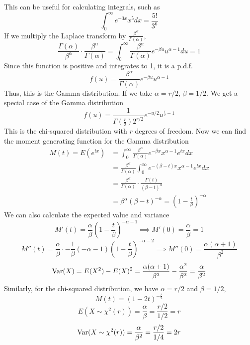 \documentclass[openany]{report}
\begin{document}
This can be useful for calculating integrals, such as 
\[\int_0^\infty e^{-3x}x^5dx = \frac{5!}{3^6}\]
If we multiply the Laplace transform by $\frac{\beta^\alpha}{\Gamma(\alpha)}$, 
\[\frac{\Gamma(\alpha)}{\beta^\alpha} \cdot \frac{\beta^\alpha}{\Gamma(\alpha)} = \int_0^\infty \frac{\beta^{\alpha}}{\Gamma(\alpha)}e^{-\beta u}u^{\alpha -1}du = 1 \]
Since this function is positive and integrates to 1, it is a p.d.f. 
\[f(u) = \frac{\beta^{\alpha}}{\Gamma(\alpha)}e^{-\beta u}u^{\alpha -1}\]
Thus, this is the Gamma distribution. If we take $\alpha = r/2$, $\beta = 1/2$. We get a special case of the Gamma distribution 
\[f(u) = \frac{1}{\Gamma\left(\frac{r}{2}\right)2^{r/2}}e^{-u/2}u^{\frac{r}{2}-1}\]
This is the chi-squared distribution with $r$ degrees of freedom. Now we can find the moment generating function for the Gamma distribution 
\begin{align*}
    M(t) = E(e^{tx}) &= \int_0^\infty \frac{\beta^\alpha}{\Gamma(\alpha)}e^{-\beta x}x^{\alpha -1}e^{tx}dx\\
    &= \frac{\beta^\alpha}{\Gamma(\alpha)}\int_0^\infty e^{-(\beta-t) x}x^{\alpha -1}e^{tx}dx\\
    &= \frac{\beta^\alpha}{\Gamma(\alpha)}\cdot \frac{\Gamma(t)}{(\beta-t)^\alpha}\\
    &= \beta^\alpha(\beta-t)^{-\alpha} = \left(1 - \frac{t}{\beta}\right)^{-\alpha} 
\end{align*}
We can also calculate the expected value and variance
\[M'(t) = \frac{\alpha}{\beta}\left(1 - \frac{t}{\beta}\right)^{-\alpha - 1} \implies M'(0) = \frac{\alpha}{\beta} = 1\]
\[M''(t) = \frac{\alpha}{\beta} \cdot -\frac{1}{\beta}(-\alpha -1)\left(1 - \frac{t}{\beta}\right)^{-\alpha -2} \implies M''(0) = \frac{\alpha(\alpha+1)}{\beta^2}\]
\[\operatorname{Var}(X) = E(X^2)-E(X)^2 = \frac{\alpha(\alpha+1)}{\beta^2} - \frac{\alpha^2}{\beta^2} = \frac{\alpha}{\beta^2}\]
Similarly, for the chi-squared distribution, we have $\alpha = r/2$ and $\beta = 1/2$,
\[M(t) = (1-2t)^{-\frac{r}{2}}\]
\[E(X\sim \chi^2(r)) = \frac{\alpha}{\beta}=\frac{r/2}{1/2} = r\]
\[\operatorname{Var}(X \sim \chi^2(r)) = \frac{\alpha}{\beta^2} = \frac{r/2}{1/4} = 2r \]
\end{document}
